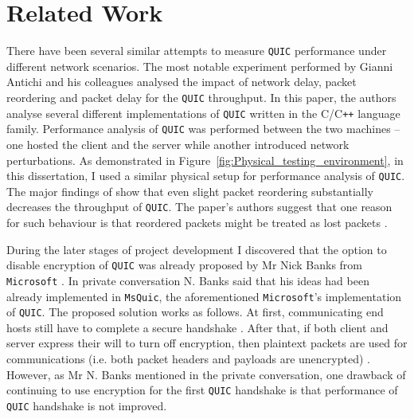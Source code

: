 \documentclass[12pt,a4paper,twoside,openright]{report}
\begin{document}
\section{Related Work}
There have been several similar attempts to measure \texttt{QUIC} performance under different network scenarios. 
The most notable experiment performed by Gianni Antichi and his colleagues \cite{Making_QUIC_Quicker} analysed the impact of network delay, packet reordering and packet delay for the \texttt{QUIC} throughput. 
In this paper, the authors analyse several different implementations of \texttt{QUIC} written in the C/C\texttt{++} language family.
Performance analysis of \texttt{QUIC} was performed between the two machines -- one hosted the client and the server while another introduced network perturbations.
As demonstrated in Figure~\ref{fig:Physical_testing_environment}, in this dissertation, I used a similar physical setup for performance analysis of \texttt{QUIC}.
The major findings of \cite{Making_QUIC_Quicker} show that even slight packet reordering substantially decreases the throughput of \texttt{QUIC}.
The paper's authors suggest that one reason for such behaviour is that reordered packets might be treated as lost packets \cite{Making_QUIC_Quicker}. 


During the later stages of project development I discovered that the option to disable encryption of \texttt{QUIC} was already proposed by Mr Nick Banks from \texttt{Microsoft} \cite{banks-quic-disable-encryption-00}.
In private conversation N. Banks said that his ideas had been already implemented in \texttt{MsQuic}, the aforementioned \texttt{Microsoft}'s implementation of \texttt{QUIC}.
The proposed solution works as follows.
At first, communicating end hosts still have to complete a secure handshake \cite{banks-quic-disable-encryption-00}.
After that, if both client and server express their will to turn off encryption, then plaintext packets are used for communications (i.e. both packet headers and payloads are unencrypted) \cite{banks-quic-disable-encryption-00}.
However, as Mr N. Banks mentioned in the private conversation, one drawback of continuing to use encryption for the first \texttt{QUIC} handshake is that performance of \texttt{QUIC} handshake is not improved.
\end{document}
